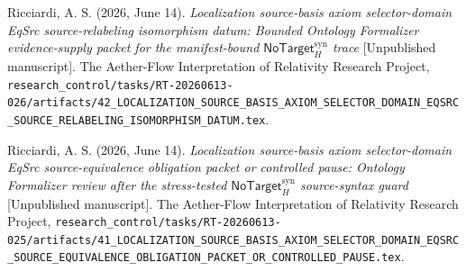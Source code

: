 \documentclass[11pt]{article}
\newcommand{\NoTargetSyn}{\mathsf{NoTarget}_{H}^{\mathrm{syn}}}
\begin{document}
Ricciardi, A. S. (2026, June 14). \emph{Localization source-basis axiom
selector-domain EqSrc source-relabeling isomorphism datum: Bounded
Ontology Formalizer evidence-supply packet for the manifest-bound
\(\NoTargetSyn\) trace} [Unpublished manuscript]. The Aether-Flow
Interpretation of Relativity Research Project,
\texttt{research\_control/tasks/RT-20260613-026/artifacts/42\_LOCALIZATION\_SOURCE\_BASIS\_AXIOM\_SELECTOR\_DOMAIN\_EQSRC\_SOURCE\_RELABELING\_ISOMORPHISM\_DATUM.tex}.

Ricciardi, A. S. (2026, June 14). \emph{Localization source-basis axiom
selector-domain EqSrc source-equivalence obligation packet or controlled
pause: Ontology Formalizer review after the stress-tested
\(\NoTargetSyn\) source-syntax guard} [Unpublished manuscript]. The
Aether-Flow Interpretation of Relativity Research Project,
\texttt{research\_control/tasks/RT-20260613-025/artifacts/41\_LOCALIZATION\_SOURCE\_BASIS\_AXIOM\_SELECTOR\_DOMAIN\_EQSRC\_SOURCE\_EQUIVALENCE\_OBLIGATION\_PACKET\_OR\_CONTROLLED\_PAUSE.tex}.
\end{document}
